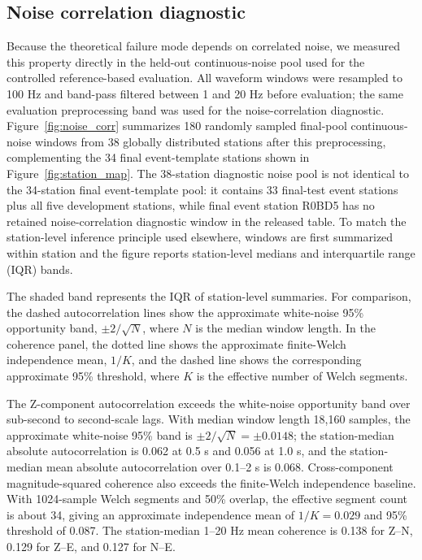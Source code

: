 \documentclass[review,12pt,authoryear]{elsarticle}
\begin{document}
\subsection{Noise correlation diagnostic}
\label{sec:noise_corr}
Because the theoretical failure mode depends on correlated noise, we measured this property directly in the held-out continuous-noise pool used for the controlled reference-based evaluation. All waveform windows were resampled to 100 Hz and band-pass filtered between 1 and 20 Hz before evaluation; the same evaluation preprocessing band was used for the noise-correlation diagnostic. Figure~\ref{fig:noise_corr} summarizes 180 randomly sampled final-pool continuous-noise windows from 38 globally distributed stations after this preprocessing, complementing the 34 final event-template stations shown in Figure~\ref{fig:station_map}. The 38-station diagnostic noise pool is not identical to the 34-station final event-template pool: it contains 33 final-test event stations plus all five development stations, while final event station R0BD5 has no retained noise-correlation diagnostic window in the released table. To match the station-level inference principle used elsewhere, windows are first summarized within station and the figure reports station-level medians and interquartile range (IQR) bands.

The shaded band represents the IQR of station-level summaries. For comparison, the dashed autocorrelation lines show the approximate white-noise 95\% opportunity band, $\pm 2/\sqrt{N}$, where $N$ is the median window length. In the coherence panel, the dotted line shows the approximate finite-Welch independence mean, $1/K$, and the dashed line shows the corresponding approximate 95\% threshold, where $K$ is the effective number of Welch segments.

The Z-component autocorrelation exceeds the white-noise opportunity band over sub-second to second-scale lags. With median window length 18,160 samples, the approximate white-noise 95\% band is $\pm 2/\sqrt{N}=\pm 0.0148$; the station-median absolute autocorrelation is 0.062 at 0.5 s and 0.056 at 1.0 s, and the station-median mean absolute autocorrelation over 0.1--2 s is 0.068. Cross-component magnitude-squared coherence also exceeds the finite-Welch independence baseline. With 1024-sample Welch segments and 50\% overlap, the effective segment count is about 34, giving an approximate independence mean of $1/K=0.029$ and 95\% threshold of 0.087. The station-median 1--20 Hz mean coherence is 0.138 for Z--N, 0.129 for Z--E, and 0.127 for N--E.
\end{document}
